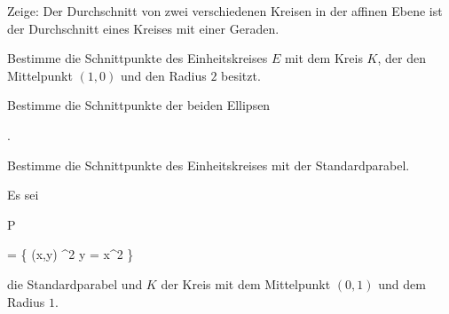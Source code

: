 {}


{


Zeige: Der Durchschnitt von zwei verschiedenen Kreisen in der affinen Ebene ist der Durchschnitt eines Kreises mit einer Geraden.


}


{} {}




{}


{


Bestimme die Schnittpunkte des Einheitskreises $E$  mit dem Kreis $K$, der den Mittelpunkt $(1,0)$ und den Radius $2$ besitzt.


}


{} {}




{}


{


Bestimme die Schnittpunkte der beiden Ellipsen


 { . }


}


{} {}




{}


{


Bestimme die Schnittpunkte des Einheitskreises mit der Standardparabel.


}


{} {}




{}


{


Es sei


\mavergleichskettedisp


{\vergleichskette


{P
}


{ =} { \left\{ (x,y) \in \R^2  \mid   y = x^2         \right\}
}


{ } {
}


{ } {
}


{ } {
}


}
{}{}{}
die Standardparabel und $K$ der Kreis mit dem Mittelpunkt $(0,1)$ und dem Radius $1$.


}


